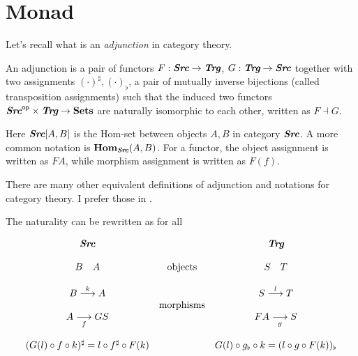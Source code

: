 \chapter{Monad}
\label{monad}

Let's recall what is an {\it adjunction} in category theory.
\def\mathbi#1{\textbf{\em #1}} 
\newcommand{\Src}{\mathbi{Src}}
\newcommand{\Trg}{\mathbi{Trg}}

\begin{definition}
    An adjunction is a pair of functors $F:\Src\to\Trg$, $G:\Trg\to\Src$ 
    together with two assignments $(\cdot)^\sharp,(\cdot)_\flat$, a pair 
    of mutually inverse bijections (called transposition assignments)
    \eq {
        \Src[A,GS] &\to \Trg[FA, S] \\
        f &\mapsto f^\sharp \\
        \\
        \Trg[FA, S] &\to \Src[A,GS] \\
        g &\mapsto g_\flat
    }
    such that the induced two functors $\Src\op\times\Trg\to\Sets$
    are naturally isomorphic to each other, written as $F\dashv G$. 
    
    Here $\Src[A,B]$ is the Hom-set between objects $A,B$ in category
    $\Src$. A more common notation is $\Hom_\Src(A,B)$. For a functor,
    the object assignment is written as $FA$, while morphism assignment
    is written as $F(f)$. 

    There are many other equivalent definitions of adjunction and 
    notations for category theory. I prefer those in 
    \cite{simmons2011introduction}.
\end{definition}

The naturality can be rewritten as for all

$$
\begin{array}{ccc}
    \Src & \qquad & \Trg \\\\
    B\quad A & \text{objects} & S\quad T \\\\
    B \overset{k} \longrightarrow A & & S \overset{l} \longrightarrow T\\
    & \text{morphisms} & \\
    A \underset{f} \longrightarrow GS & & FA \underset{g} \longrightarrow S\\\\
    (G(l)\circ f\circ k)^\sharp = l\circ f^\sharp\circ F(k) & &
    G(l)\circ g_\flat \circ k = (l\circ g\circ F(k))_\flat
\end{array}
$$

